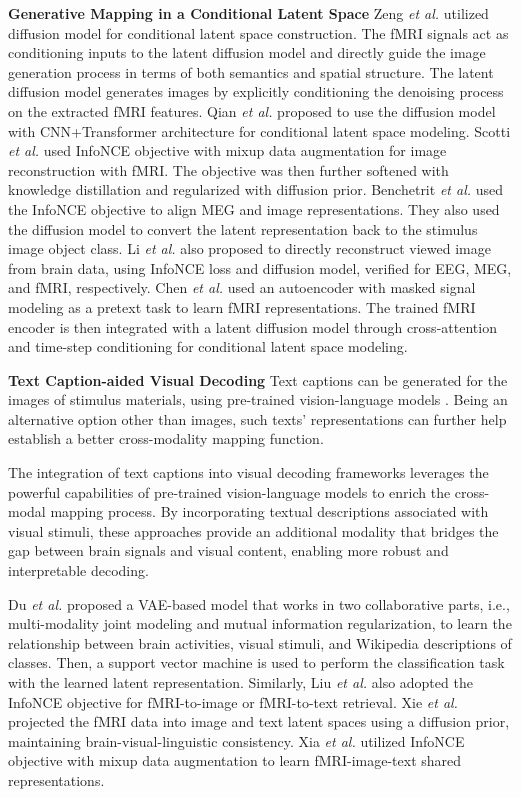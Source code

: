 \documentclass[journal]{IEEEtran}
\begin{document}
\textbf{Generative Mapping in a Conditional Latent Space} Zeng \emph{et al.} \cite{Zeng2024} utilized diffusion model for conditional latent space construction. The fMRI signals act as conditioning inputs to the latent diffusion model and directly guide the image generation process in terms of both semantics and spatial structure. The latent diffusion model generates images by explicitly conditioning the denoising process on the extracted fMRI features. Qian \emph{et al.} \cite{Qian2024a} proposed to use the diffusion model with CNN+Transformer architecture for conditional latent space modeling. Scotti \emph{et al.} \cite{Scotti2023} used InfoNCE objective with mixup data augmentation \cite{Zhang2018Mixup} for image reconstruction with fMRI. The objective was then further softened with knowledge distillation and regularized with diffusion prior. Benchetrit \emph{et al.} \cite{Benchetrit2024} used the InfoNCE objective to align MEG and image representations. They also used the diffusion model to convert the latent representation back to the stimulus image object class. Li \emph{et al.} \cite{Li2024} also proposed to directly reconstruct viewed image from brain data, using InfoNCE loss and diffusion model, verified for EEG, MEG, and fMRI, respectively. Chen \emph{et al.} \cite{Chen2023} used an autoencoder with masked signal modeling as a pretext task to learn fMRI representations. The trained fMRI encoder is then integrated with a latent diffusion model through cross-attention and time-step conditioning for conditional latent space modeling.

\textbf{Text Caption-aided Visual Decoding} Text captions can be generated for the images of stimulus materials, using pre-trained vision-language models \cite{Zhang2024VLM}. Being an alternative option other than images, such texts' representations can further help establish a better cross-modality mapping function.

The integration of text captions into visual decoding frameworks leverages the powerful capabilities of pre-trained vision-language models \cite{Zhang2024VLM} to enrich the cross-modal mapping process. By incorporating textual descriptions associated with visual stimuli, these approaches provide an additional modality that bridges the gap between brain signals and visual content, enabling more robust and interpretable decoding.

Du \emph{et al.} \cite{Du2023} proposed a VAE-based model that works in two collaborative parts, i.e., multi-modality joint modeling and mutual information regularization, to learn the relationship between brain activities, visual stimuli, and Wikipedia descriptions of classes. Then, a support vector machine is used to perform the classification task with the learned latent representation. Similarly, Liu \emph{et al.} \cite{Liu2023} also adopted the InfoNCE objective for fMRI-to-image or fMRI-to-text retrieval. Xie \emph{et al.} \cite{Xie2024} projected the fMRI data into image and text latent spaces using a diffusion prior, maintaining brain-visual-linguistic consistency. Xia \emph{et al.} \cite{Xia2024} utilized InfoNCE objective with mixup data augmentation to learn fMRI-image-text shared representations.
\end{document}
